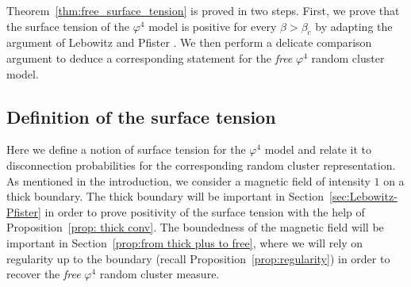 \documentclass[11pt,a4paper]{article}
\theoremstyle{definition}
\numberwithin{equation}{section}
\begin{document}
Theorem~\ref{thm:free_surface_tension} is proved in two steps. First, we prove that the surface tension of the $\varphi^4$ model is positive for every $\beta>\beta_c$ by adapting the argument of Lebowitz and Pfister \cite{lebowitz1981surface}. We then perform a delicate comparison argument to deduce a corresponding statement for the \emph{free} $\varphi^4$ random cluster model.


\subsection{Definition of the surface tension}

Here we define a notion of surface tension for the $\varphi^4$ model and relate it to disconnection probabilities for the corresponding random cluster representation. As mentioned in the introduction, we consider a magnetic field of intensity $1$ on a thick boundary. The thick boundary will be important in Section~\ref{sec:Lebowitz-Pfister} in order to prove positivity of the surface tension with the help of Proposition~\ref{prop: thick conv}. The boundedness of the magnetic field will be important in Section~\ref{prop:from thick plus to free}, where we will rely on regularity up to the boundary (recall Proposition~\ref{prop:regularity}) in order to recover the \emph{free} $\varphi^4$ random cluster measure.
\end{document}
